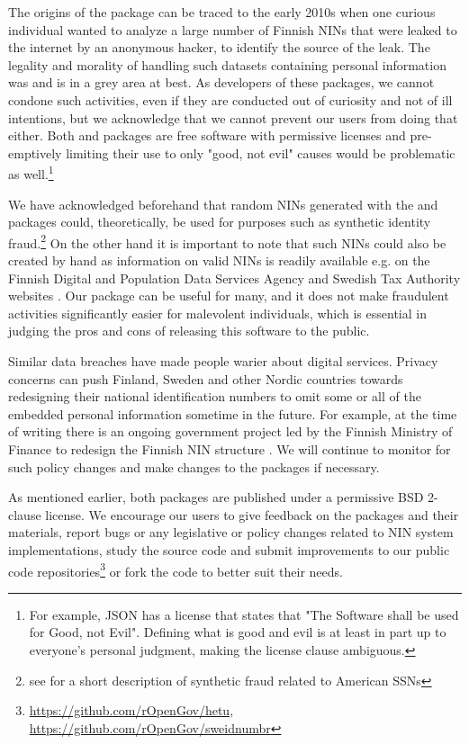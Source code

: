 The origins of the  package can be traced to the early 2010s when one curious individual wanted to analyze a large number of Finnish NINs that were leaked to the internet by an anonymous hacker, to identify the source of the leak. The legality and morality of handling such datasets containing personal information was and is in a grey area at best. As developers of these packages, we cannot condone such activities, even if they are conducted out of curiosity and not of ill intentions, but we acknowledge that we cannot prevent our users from doing that either. Both  and  packages are free software with permissive licenses and pre-emptively limiting their use to only "good, not evil" causes would be problematic as well.\footnote{For example, JSON has a license that states that "The Software shall be used for Good, not Evil". Defining what is good and evil is at least in part up to everyone's personal judgment, making the license clause ambiguous.}

We have acknowledged beforehand that random NINs generated with the  and  packages could, theoretically, be used for purposes such as synthetic identity fraud.\footnote{see \citet[32]{brensinger2021} for a short description of synthetic fraud related to American SSNs} On the other hand it is important to note that such NINs could also be created by hand as information on valid NINs is readily available e.g. on the Finnish Digital and Population Data Services Agency and Swedish Tax Authority websites \citep{hetudvv, sv2007}. Our package can be useful for many, and it does not make fraudulent activities significantly easier for malevolent individuals, which is essential in judging the pros and cons of releasing this software to the public.

Similar data breaches have made people warier about digital services. Privacy concerns can push Finland, Sweden and other Nordic countries towards redesigning their national identification numbers to omit some or all of the embedded personal information sometime in the future. For example, at the time of writing there is an ongoing government project led by the Finnish Ministry of Finance to redesign the Finnish NIN structure \citep{valtiovarainministerio2022}. We will continue to monitor for such policy changes and make changes to the packages if necessary.

As mentioned earlier, both packages are published under a permissive BSD 2-clause license. We encourage our users to give feedback on the packages and their materials, report bugs or any legislative or policy changes related to NIN system implementations, study the source code and submit improvements to our public code repositories\footnote{\url{https://github.com/rOpenGov/hetu}, \url{https://github.com/rOpenGov/sweidnumbr}} or fork the code to better suit their needs.

